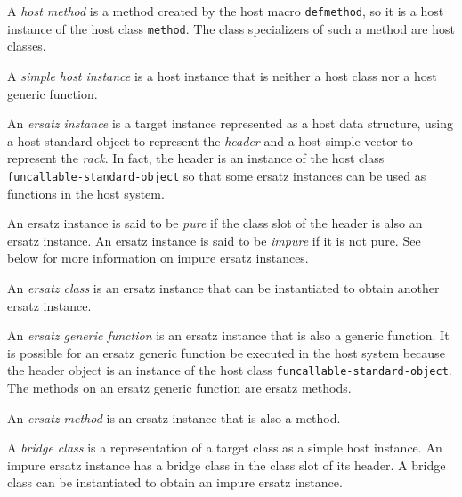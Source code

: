 \begin{definition}
A \emph{host method} is a method created by the host macro
\texttt{defmethod}, so it is a host instance of the host class
\texttt{method}.  The class specializers of such a method are host
classes.
\end{definition}

\begin{definition}
A \emph{simple host instance} is a host instance that is neither a
host class nor a host generic function.
\end{definition}

\begin{definition}
An \emph{ersatz instance} is a target instance represented as a host
data structure, using a host standard object to represent the
\emph{header} and a host simple vector to represent the \emph{rack}.
In fact, the header is an instance of the host class
\texttt{funcallable-standard-object} so that some ersatz instances can
be used as functions in the host system.
\end{definition}

\begin{definition}
An ersatz instance is said to be \emph{pure} if the class slot of the
header is also an ersatz instance.  An ersatz instance is said to be
\emph{impure} if it is not pure.  See below for more information on
impure ersatz instances.
\end{definition}

\begin{definition}
An \emph{ersatz class} is an ersatz instance that can be instantiated
to obtain another ersatz instance.
\end{definition}

\begin{definition}
An \emph{ersatz generic function} is an ersatz instance that is also a
generic function.  It is possible for an ersatz generic function be
executed in the host system because the header object is an instance
of the host class \texttt{funcallable-standard-object}.  The methods
on an ersatz generic function are ersatz methods.
\end{definition}

\begin{definition}
An \emph{ersatz method} is an ersatz instance that is also a method.
\end{definition}

\begin{definition}
A \emph{bridge class} is a representation of a target class as a
simple host instance.  An impure ersatz instance has a bridge class in
the class slot of its header.  A bridge class can be instantiated to
obtain an impure ersatz instance.
\end{definition}

